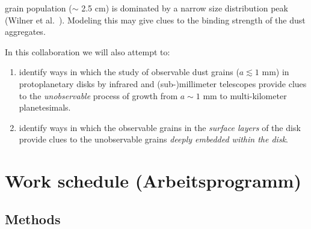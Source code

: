 \begin{enumerate}
\begin{enumerate}
grain population ($\sim$ 2.5 cm) is dominated by a narrow size distribution
peak (Wilner et al.~). Modeling this may give clues to the binding
strength of the dust aggregates.\label{dulgoal-willner}
\end{enumerate}
In this collaboration we will also attempt to:
\begin{enumerate}
\item identify ways in which the study of observable dust grains ($a\lesssim
1$ mm) in protoplanetary disks by infrared and (sub-)millimeter telescopes
provide clues to the {\em unobservable} process of growth from $a\sim 1$ mm
to multi-kilometer planetesimals.\label{dulgoal-linkobs}
\item identify ways in which the observable grains in the {\em surface
layers} of the disk provide clues to the unobservable grains {\em deeply
embedded within the disk}.
\end{enumerate}
\end{enumerate}



\section{Work schedule (Arbeitsprogramm)}
\subsection{Methods}
